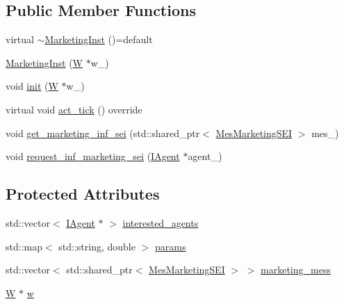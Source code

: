 \subsection*{Public Member Functions}
\begin{DoxyCompactItemize}
\item 
virtual \hyperlink{classsolar__core_1_1_marketing_inst_ac61af6e8886ffff29e040c98f1500c77}{$\sim$\+Marketing\+Inst} ()=default
\item 
\hyperlink{classsolar__core_1_1_marketing_inst_abd9e85a42a8052a9baeaa09ef87710a2}{Marketing\+Inst} (\hyperlink{classsolar__core_1_1_w}{W} $\ast$w\+\_\+)
\item 
void \hyperlink{classsolar__core_1_1_marketing_inst_ae83f5529280d28b312e8e723b811d75b}{init} (\hyperlink{classsolar__core_1_1_w}{W} $\ast$w\+\_\+)
\item 
virtual void \hyperlink{classsolar__core_1_1_marketing_inst_a6ad2e259f3ea536cee2c744ac177d470}{act\+\_\+tick} () override
\end{DoxyCompactItemize}
{\bf }\par
\begin{DoxyCompactItemize}
\item 
void \hyperlink{classsolar__core_1_1_marketing_inst_af9ff802d6373dc91177959508e80d563}{get\+\_\+marketing\+\_\+inf\+\_\+sei} (std\+::shared\+\_\+ptr$<$ \hyperlink{classsolar__core_1_1_mes_marketing_s_e_i}{Mes\+Marketing\+S\+E\+I} $>$ mes\+\_\+)
\item 
void \hyperlink{classsolar__core_1_1_marketing_inst_a0eb7c3b990063684a04c7b5f38138cbf}{request\+\_\+inf\+\_\+marketing\+\_\+sei} (\hyperlink{classsolar__core_1_1_i_agent}{I\+Agent} $\ast$agent\+\_\+)
\end{DoxyCompactItemize}

\subsection*{Protected Attributes}
\begin{DoxyCompactItemize}
\item 
std\+::vector$<$ \hyperlink{classsolar__core_1_1_i_agent}{I\+Agent} $\ast$ $>$ \hyperlink{classsolar__core_1_1_marketing_inst_a5e0f3d40db44d0779a944ecdad24d447}{interested\+\_\+agents}
\item 
std\+::map$<$ std\+::string, double $>$ \hyperlink{classsolar__core_1_1_marketing_inst_a58a4f5acc2492edebfde65bee94802b9}{params}
\item 
std\+::vector$<$ std\+::shared\+\_\+ptr$<$ \hyperlink{classsolar__core_1_1_mes_marketing_s_e_i}{Mes\+Marketing\+S\+E\+I} $>$ $>$ \hyperlink{classsolar__core_1_1_marketing_inst_af386df7399502fc26c6625600a68edb3}{marketing\+\_\+mess}
\item 
\hyperlink{classsolar__core_1_1_w}{W} $\ast$ \hyperlink{classsolar__core_1_1_marketing_inst_aaa4baafee95460ccda0e4b580c88e8cb}{w}
\end{DoxyCompactItemize}


